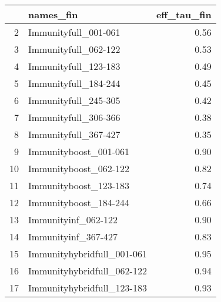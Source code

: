 \begin{table}[ht]
\centering
\begin{tabular}{rlr}
  \hline
 & names\_fin & eff\_tau\_fin \\ 
  \hline
2 & Immunityfull\_001-061 & 0.56 \\ 
  3 & Immunityfull\_062-122 & 0.53 \\ 
  4 & Immunityfull\_123-183 & 0.49 \\ 
  5 & Immunityfull\_184-244 & 0.45 \\ 
  6 & Immunityfull\_245-305 & 0.42 \\ 
  7 & Immunityfull\_306-366 & 0.38 \\ 
  8 & Immunityfull\_367-427 & 0.35 \\ 
  9 & Immunityboost\_001-061 & 0.90 \\ 
  10 & Immunityboost\_062-122 & 0.82 \\ 
  11 & Immunityboost\_123-183 & 0.74 \\ 
  12 & Immunityboost\_184-244 & 0.66 \\ 
  13 & Immunityinf\_062-122 & 0.90 \\ 
  14 & Immunityinf\_367-427 & 0.83 \\ 
  15 & Immunityhybridfull\_001-061 & 0.95 \\ 
  16 & Immunityhybridfull\_062-122 & 0.94 \\ 
  17 & Immunityhybridfull\_123-183 & 0.93 \\ 
   \hline
\end{tabular}
\end{table}
